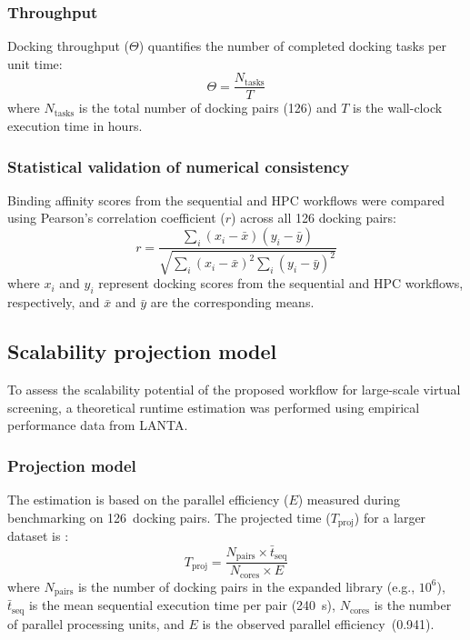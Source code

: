 \documentclass[11pt,a4paper]{article}
\begin{document}
\subsubsection{Throughput}

Docking throughput ($\Theta$) quantifies the number of completed docking tasks per unit time:
%
\begin{equation}
\Theta = \frac{N_{\text{tasks}}}{T}
\label{eq:throughput}
\end{equation}
%
where $N_{\text{tasks}}$ is the total number of docking pairs (126) and $T$ is the wall-clock execution time in hours.

\subsubsection{Statistical validation of numerical consistency}

Binding affinity scores from the sequential and HPC workflows were compared using Pearson's correlation coefficient ($r$) \cite{hothorn2011} across all 126 docking pairs:
%
\begin{equation}
r = \frac{\sum_{i}(x_i - \bar{x})(y_i - \bar{y})}{\sqrt{\sum_{i}(x_i - \bar{x})^2 \sum_{i}(y_i - \bar{y})^2}}
\label{eq:pearson}
\end{equation}
%
where $x_i$ and $y_i$ represent docking scores from the sequential and HPC workflows, respectively, and $\bar{x}$ and $\bar{y}$ are the corresponding means.


\subsection{Scalability projection model}

To assess the scalability potential of the proposed workflow for large-scale virtual screening, a theoretical runtime estimation was performed using empirical performance data from LANTA.

\subsubsection{Projection model}

The estimation is based on the parallel efficiency ($E$) measured during benchmarking on 126~docking pairs. The projected time ($T_{\text{proj}}$) for a larger dataset is \cite{gorgulla2020}:
%
\begin{equation}
T_{\text{proj}} = \frac{N_{\text{pairs}} \times \bar{t}_{\text{seq}}}{N_{\text{cores}} \times E}
\label{eq:projection}
\end{equation}
%
where $N_{\text{pairs}}$ is the number of docking pairs in the expanded library (e.g., $10^6$), $\bar{t}_{\text{seq}}$ is the mean sequential execution time per pair (\SI{240}{s}), $N_{\text{cores}}$ is the number of parallel processing units, and $E$ is the observed parallel efficiency~(0.941).
\end{document}
